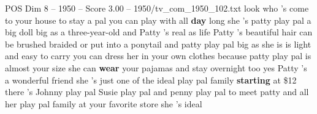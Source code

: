 \begin{textsample}{POS Dim 8 – 1950 – Score 3.00 – 1950/tv\_com\_1950\_102.txt}  \label{ex:f8_pos_005}
look who 's come to your house to stay a pal you can play with all \textbf{day} long she 's patty play pal a big doll big as a three-year-old and Patty 's real as life Patty 's beautiful hair can be brushed braided or put into a ponytail and patty play pal big as she is is light and easy to carry you can dress her in your own clothes because patty play pal is almost your size she can \textbf{wear} your pajamas and stay overnight too yes Patty 's a wonderful friend she 's just one of the ideal play pal family \textbf{starting} at \$12 there 's Johnny play pal Susie play pal and penny play pal to meet patty and all her play pal family at your favorite store she 's ideal

\end{textsample}
